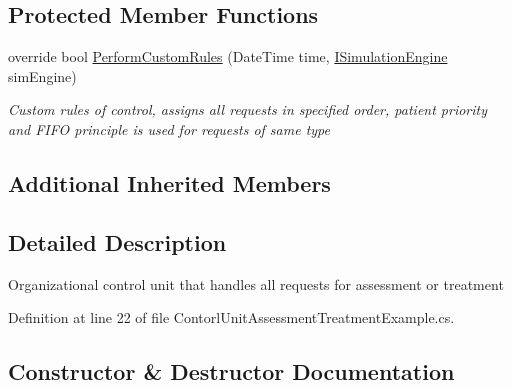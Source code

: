 \subsection*{Protected Member Functions}
\begin{DoxyCompactItemize}
\item 
override bool \hyperlink{class_sample_hospital_model_1_1_emergency_1_1_contorl_unit_assessment_treatment_example_a7c2dbc826b44ac567a2912689784fa90}{Perform\+Custom\+Rules} (Date\+Time time, \hyperlink{interface_simulation_core_1_1_simulation_classes_1_1_i_simulation_engine}{I\+Simulation\+Engine} sim\+Engine)
\begin{DoxyCompactList}\small\item\em Custom rules of control, assigns all requests in specified order, patient priority and F\+I\+FO principle is used for requests of same type \end{DoxyCompactList}\end{DoxyCompactItemize}
\subsection*{Additional Inherited Members}


\subsection{Detailed Description}
Organizational control unit that handles all requests for assessment or treatment 



Definition at line 22 of file Contorl\+Unit\+Assessment\+Treatment\+Example.\+cs.



\subsection{Constructor \& Destructor Documentation}
